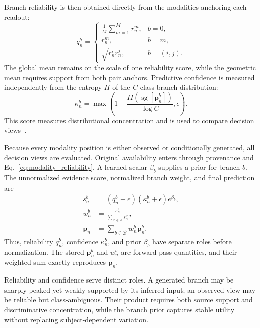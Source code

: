 \documentclass[a4paper,fleqn]{cas-dc}
\begin{document}
Branch reliability is then obtained directly from the modalities anchoring each readout:
\begin{equation}
q_n^b=
\begin{cases}
\displaystyle \frac{1}{M}\sum_{m=1}^{M}r_n^m, & b=0,\\[4pt]
r_n^m, & b=m,\\[2pt]
\sqrt{r_n^i r_n^j}, & b=(i,j).
\end{cases}
\label{eq:branch_reliability}
\end{equation}
The global mean remains on the scale of one reliability score, while the geometric mean requires support from both pair anchors. Predictive confidence is measured independently from the entropy \(H\) of the \(C\)-class branch distribution:
\begin{equation}
\kappa_n^b=\max\!\left(
1-\frac{H(\operatorname{sg}[\mathbf p_n^b])}{\log C},
\epsilon\right).
\label{eq:evidence_confidence}
\end{equation}
This score measures distributional concentration and is used to compare decision views~\cite{guo2017calibration,lakshminarayanan2017deepensembles,ovadia2019uncertainty}.

Because every modality position is either observed or conditionally generated, all decision views are evaluated. Original availability enters through provenance and Eq.~\eqref{eq:modality_reliability}. A learned scalar \(\beta_b\) supplies a prior for branch \(b\). The unnormalized evidence score, normalized branch weight, and final prediction are
\begin{equation}
\begin{aligned}
s_n^b&=(q_n^b+\epsilon)(\kappa_n^b+\epsilon)e^{\beta_b},\\
w_n^b&=\frac{s_n^b}{\sum_{b'\in\mathcal B}s_n^{b'}},\\
\mathbf p_n&=\sum_{b\in\mathcal B}w_n^b\mathbf p_n^b.
\end{aligned}
\label{eq:final_prediction}
\end{equation}
Thus, reliability \(q_n^b\), confidence \(\kappa_n^b\), and prior \(\beta_b\) have separate roles before normalization. The stored \(\mathbf p_n^b\) and \(w_n^b\) are forward-pass quantities, and their weighted sum exactly reproduces \(\mathbf p_n\).

Reliability and confidence serve distinct roles. A generated branch may be sharply peaked yet weakly supported by its inferred input; an observed view may be reliable but class-ambiguous. Their product requires both source support and discriminative concentration, while the branch prior captures stable utility without replacing subject-dependent variation.
\end{document}
